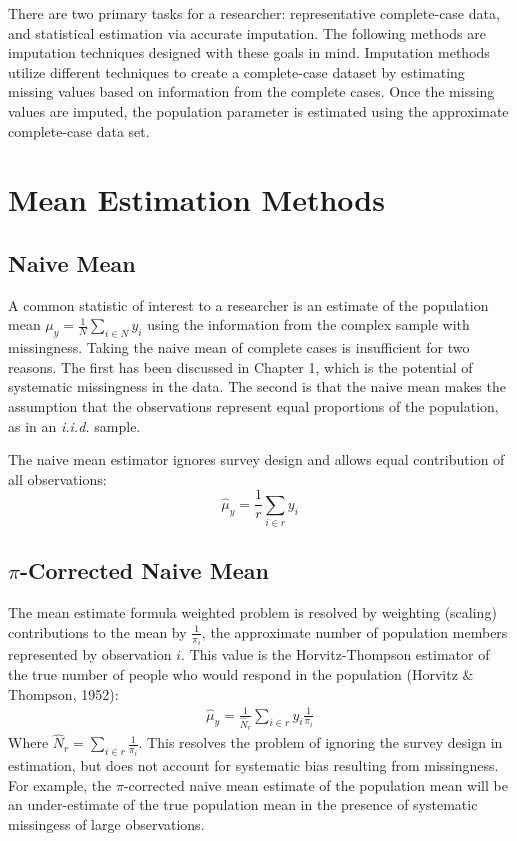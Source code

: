 \documentclass[12pt,twoside]{reedthesis}
\begin{document}
There are two primary tasks for a researcher: representative
complete-case data, and statistical estimation via accurate imputation.
The following methods are imputation techniques designed with these
goals in mind. Imputation methods utilize different techniques to create
a complete-case dataset by estimating missing values based on
information from the complete cases. Once the missing values are
imputed, the population parameter is estimated using the approximate
complete-case data set.

\section{Mean Estimation Methods}\label{mean-estimation-methods}

\subsection{Naive Mean}\label{naive-mean}

A common statistic of interest to a researcher is an estimate of the
population mean \(\mu_y = \frac{1}{N}\sum_{i \in N} y_i\) using the
information from the complex sample with missingness. Taking the naive
mean of complete cases is insufficient for two reasons. The first has
been discussed in Chapter 1, which is the potential of systematic
missingness in the data. The second is that the naive mean makes the
assumption that the observations represent equal proportions of the
population, as in an \emph{i.i.d.} sample.

The naive mean estimator ignores survey design and allows equal
contribution of all observations: \[
\hat \mu_y = \frac{1}{r} \sum_{i \in r} y_i
\]

\subsection{\texorpdfstring{\(\pi\)-Corrected Naive
Mean}{\textbackslash{}pi-Corrected Naive Mean}}\label{pi-corrected-naive-mean}

The mean estimate formula weighted problem is resolved by weighting
(scaling) contributions to the mean by \(\frac{1}{\pi_i}\), the
approximate number of population members represented by observation
\(i\). This value is the Horvitz-Thompson estimator of the true number
of people who would respond in the population (Horvitz \& Thompson,
1952):
\begin{align}
\hat \mu_y = \frac{1}{\hat N_r} \sum_{i \in r} y_i \frac{1}{\pi_i} \label{eq:HTE}
\end{align}
Where \(\hat N_r = \sum_{i \in r} \frac{1}{\pi_i}\). This resolves the
problem of ignoring the survey design in estimation, but does not
account for systematic bias resulting from missingness. For example, the
\(\pi\)-corrected naive mean estimate of the population mean will be an
under-estimate of the true population mean in the presence of systematic
missingess of large observations.
\end{document}
